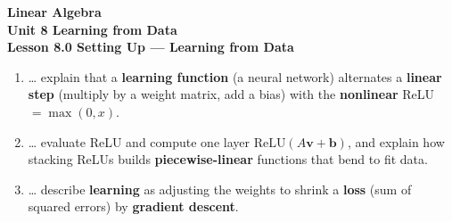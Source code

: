 \documentclass[10pt]{article}
\begin{document}
\vspace{-0.8in}

\begin{center}
  {\color{white}\textbf{\LARGE Linear Algebra}}\\[4pt]
  {\color{blushmid}\large\textbf{Unit 8 \quad Learning from Data}}\\[6pt]
  {\color{white}\textbf{\large Lesson 8.0 \quad Setting Up --- Learning from Data}}
\end{center}

\vspace{0.22in}
\namedateperiod
\vspace{0.18in}

\begin{learningtargetbox}
\small
\begin{enumerate}[leftmargin=1.5em, itemsep=5pt]
  \item \ldots{} explain that a \textbf{learning function} (a neural network) alternates a \textbf{linear step} (multiply by a weight matrix, add a bias) with the \textbf{nonlinear} ReLU $=\max(0,x)$.
  \item \ldots{} evaluate ReLU and compute one layer $\mathrm{ReLU}(A\mathbf{v}+\mathbf{b})$, and explain how stacking ReLUs builds \textbf{piecewise-linear} functions that bend to fit data.
  \item \ldots{} describe \textbf{learning} as adjusting the weights to shrink a \textbf{loss} (sum of squared errors) by \textbf{gradient descent}.
\end{enumerate}
\end{learningtargetbox}

\vspace{0.14in}
\end{document}
